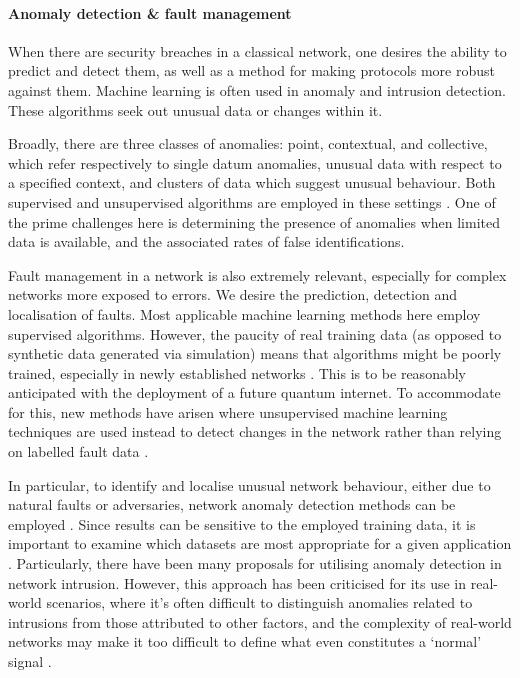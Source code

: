 \paragraph{Anomaly detection \& fault management}

When there are security breaches in a classical network, one desires the ability to predict and detect them, as well as a method for making protocols more robust against them. Machine learning is often used in anomaly and intrusion detection. These algorithms seek out unusual data or changes within it.

Broadly, there are three classes of anomalies: point, contextual, and collective, which refer respectively to single datum anomalies, unusual data with respect to a specified context, and clusters of data which suggest unusual behaviour. Both supervised and unsupervised algorithms are employed in these settings \cite{bib:thottan2003anomaly, bib:ahmed2007machine}. One of the prime challenges here is determining the presence of anomalies when limited data is available, and the associated rates of false identifications.

Fault management in a network is also extremely relevant, especially for complex networks more exposed to errors. We desire the prediction, detection and localisation of faults. Most applicable machine learning methods here employ supervised algorithms. However, the paucity of real training data (as opposed to synthetic data generated via simulation) means that algorithms might be poorly trained, especially in newly established networks \cite{bib:hood1997proactive, bib:kogeda2006prediction, bib:snow2005assessing}. This is to be reasonably anticipated with the deployment of a future quantum internet. To accommodate for this, new methods have arisen where unsupervised machine learning techniques are used instead to detect changes in the network rather than relying on labelled fault data \cite{bib:hajji2005statistical}.

In particular, to identify and localise unusual network behaviour, either due to natural faults or adversaries, network anomaly detection methods can be employed \cite{bib:ahmed2007machine, bib:fraley2017promise, bib:joseph2013machine}. Since results can be sensitive to the employed training data, it is important to examine which datasets are most appropriate for a given application \cite{bib:yavanoglu2017review}. Particularly, there have been many proposals for utilising anomaly detection in network intrusion. However, this approach has been criticised for its use in real-world scenarios, where it's often difficult to distinguish anomalies related to intrusions from those attributed to other factors, and the complexity of real-world networks may make it too difficult to define what even constitutes a `normal' signal \cite{bib:sommer2010outside}.

